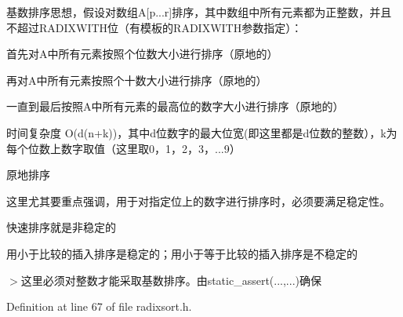 \begin{DoxyItemize}
\item 基数排序思想，假设对数组\+A\mbox{[}p...r\mbox{]}排序，其中数组中所有元素都为正整数，并且不超过\+R\+A\+D\+I\+X\+W\+I\+T\+H位（有模板的\+R\+A\+D\+I\+X\+W\+I\+T\+H参数指定）：
\begin{DoxyItemize}
\item 首先对\+A中所有元素按照个位数大小进行排序（原地的）
\item 再对\+A中所有元素按照个十数大小进行排序（原地的）
\item 一直到最后按照\+A中所有元素的最高位的数字大小进行排序（原地的）
\end{DoxyItemize}
\item 时间复杂度 O(d(n+k))，其中d位数字的最大位宽(即这里都是d位数的整数），k为每个位数上数字取值（这里取0，1，2，3，...9）
\item 原地排序

这里尤其要重点强调，用于对指定位上的数字进行排序时，必须要满足稳定性。
\begin{DoxyItemize}
\item 快速排序就是非稳定的
\item 用小于比较的插入排序是稳定的；用小于等于比较的插入排序是不稳定的
\end{DoxyItemize}
\end{DoxyItemize}

$>$这里必须对整数才能采取基数排序。由static\+\_\+assert(...,...)确保 

Definition at line 67 of file radixsort.\+h.

